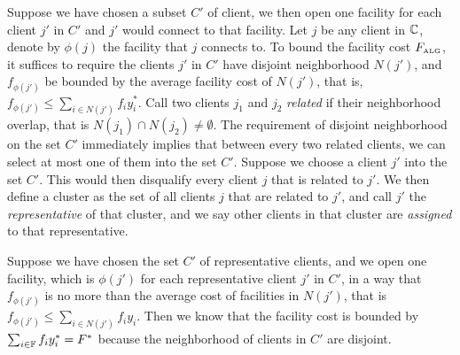 \documentclass[oneside,final]{ucr}
\begin{document}
Suppose we have chosen a subset $C'$ of client, we then open
one facility for each client $j'$ in $C'$ and $j'$ would
connect to that facility. Let $j$ be any client in
$\mathbb{C}$, denote by $\phi(j)$ the facility that $j$
connects to. To bound the facility cost $F_{\mbox{\tiny\rm ALG}}$, it
suffices to require the clients $j'$ in $C'$ have disjoint
neighborhood $N(j')$, and $f_{\phi(j')}$ be bounded by the
average facility cost of $N(j')$, that is, $f_{\phi(j')}
\leq \sum_{i\in N(j')} f_i y_i^\ast$. Call two clients $j_1$
and $j_2$ \emph{related} if their neighborhood overlap, that
is $N(j_1) \cap N(j_2) \neq \emptyset$. The requirement of
disjoint neighborhood on the set $C'$ immediately implies
that between every two related clients, we can select at
most one of them into the set $C'$. Suppose we choose a
client $j'$ into the set $C'$. This would then disqualify
every client $j$ that is related to $j'$. We then define a
cluster as the set of all clients $j$ that are related to
$j'$, and call $j'$ the \emph{representative} of that
cluster, and we say other clients in that cluster are
\emph{assigned} to that representative.

Suppose we have chosen the set $C'$ of representative
clients, and we open one facility, which is $\phi(j')$ for
each representative client $j'$ in $C'$, in a way that
$f_{\phi(j')}$ is no more than the average cost of
facilities in $N(j')$, that is $f_{\phi(j')} \leq \sum_{i\in
  N(j')} f_{i} y_{i}$. Then we know that the facility cost
is bounded by $\sum_{i\in \mathbb{F}} f_i y_i^\ast = F^\ast$
because the neighborhood of clients in $C'$ are disjoint.
\end{document}
